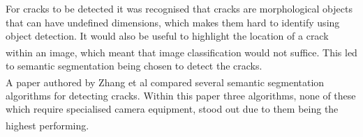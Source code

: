 \documentclass[11pt]{article}		%
\newcommand{\supercite}[1]{\textsuperscript{\cite{#1}}}		%
\begin{document}
		For cracks to be detected it was recognised that cracks are morphological objects that can have undefined dimensions, which makes them hard to identify using object detection. It would also be useful to highlight the location of a crack within an image, which meant that image classification would not suffice\supercite{morphological}. This led to semantic segmentation being chosen to detect the cracks. 
		\\
        \hspace*{2ex}A paper authored by Zhang et al\supercite{CrackGAN1} compared several semantic segmentation algorithms for detecting cracks. Within this paper three algorithms, none of these which require specialised camera equipment, stood out due to them being the highest performing\supercite{CrackGAN1}.
                    	        	       
\end{document}
